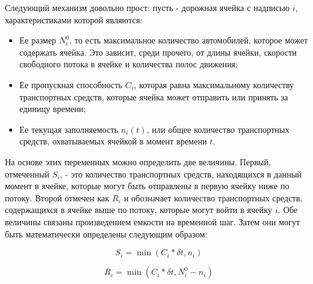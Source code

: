 Следующий механизм довольно прост: пусть - дорожная ячейка с надписью $i$, характеристиками которой являются:


\begin{itemize}
    \item Ее размер $N_i^0$, то есть максимальное количество автомобилей, которое может содержать ячейка. Это зависит, среди прочего, от длины ячейки, скорости свободного потока в ячейке и количества полос движения;
    \item Ее пропускная способность $C_i$, которая равна максимальному количеству транспортных средств, которые ячейка может отправить или принять за единицу времени;
    \item Ее текущая заполняемость $n_i(t)$, или общее количество транспортных средств, охватываемых ячейкой в момент времени $t$.
\end{itemize}


На основе этих переменных можно определить две величины. Первый, отмеченный $S_i$, - это количество транспортных средств, находящихся в данный момент в ячейке, которые могут быть отправлены в первую ячейку ниже по потоку. Второй отмечен как $R_i$ и обозначает количество транспортных средств, содержащихся в ячейке выше по потоку, которые могут войти в ячейку $i$. Обе величины связаны произведением емкости на временной шаг. Затем они могут быть математически определены следующим образом:

\begin{equation}
    \label{eqn:Si}
    S_i = \min(C_i * \delta t, n_i)
\end{equation}

\begin{equation}
    \label{eqn:Ri}
    R_i = \min(C_i * \delta t, N_i^0 − n_i)
\end{equation}

